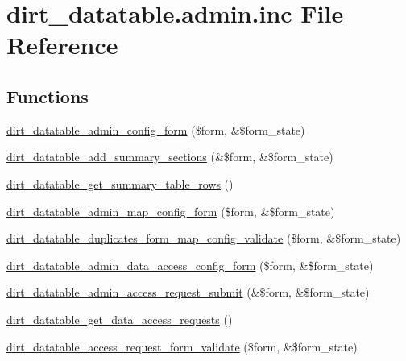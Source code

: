 \hypertarget{dirt__datatable_8admin_8inc}{}\section{dirt\+\_\+datatable.\+admin.\+inc File Reference}
\label{dirt__datatable_8admin_8inc}
\subsection*{Functions}
\begin{DoxyCompactItemize}
\item 
\mbox{\hyperlink{dirt__datatable_8admin_8inc_adbe703634a8f6ab5eeb3a7b3baad3a94}{dirt\+\_\+datatable\+\_\+admin\+\_\+config\+\_\+form}} (\$form, \&\$form\+\_\+state)
\item 
\mbox{\hyperlink{dirt__datatable_8admin_8inc_a928a04809f8bae2a53d5567bcbeeb1db}{dirt\+\_\+datatable\+\_\+add\+\_\+summary\+\_\+sections}} (\&\$form, \&\$form\+\_\+state)
\item 
\mbox{\hyperlink{dirt__datatable_8admin_8inc_a51db0e3dc5cb0065ac6d7bcf14354bdf}{dirt\+\_\+datatable\+\_\+get\+\_\+summary\+\_\+table\+\_\+rows}} ()
\item 
\mbox{\hyperlink{dirt__datatable_8admin_8inc_a608561dbdc708fed081138780f15d551}{dirt\+\_\+datatable\+\_\+admin\+\_\+map\+\_\+config\+\_\+form}} (\$form, \&\$form\+\_\+state)
\item 
\mbox{\hyperlink{dirt__datatable_8admin_8inc_a06c2376f2882925974a466d269d058e1}{dirt\+\_\+datatable\+\_\+duplicates\+\_\+form\+\_\+map\+\_\+config\+\_\+validate}} (\$form, \&\$form\+\_\+state)
\item 
\mbox{\hyperlink{dirt__datatable_8admin_8inc_adde6664ba7357d543fdd9a013c68ccac}{dirt\+\_\+datatable\+\_\+admin\+\_\+data\+\_\+access\+\_\+config\+\_\+form}} (\$form, \&\$form\+\_\+state)
\item 
\mbox{\hyperlink{dirt__datatable_8admin_8inc_a15326ddf6aecdb113504d03a3e75e09c}{dirt\+\_\+datatable\+\_\+admin\+\_\+access\+\_\+request\+\_\+submit}} (\&\$form, \&\$form\+\_\+state)
\item 
\mbox{\hyperlink{dirt__datatable_8admin_8inc_a17b55d85a3491dd72443245fa187146e}{dirt\+\_\+datatable\+\_\+get\+\_\+data\+\_\+access\+\_\+requests}} ()
\item 
\mbox{\hyperlink{dirt__datatable_8admin_8inc_ad925cf4448a24a50927cad5e8f892e95}{dirt\+\_\+datatable\+\_\+access\+\_\+request\+\_\+form\+\_\+validate}} (\$form, \&\$form\+\_\+state)
\item 

\end{DoxyCompactItemize}
